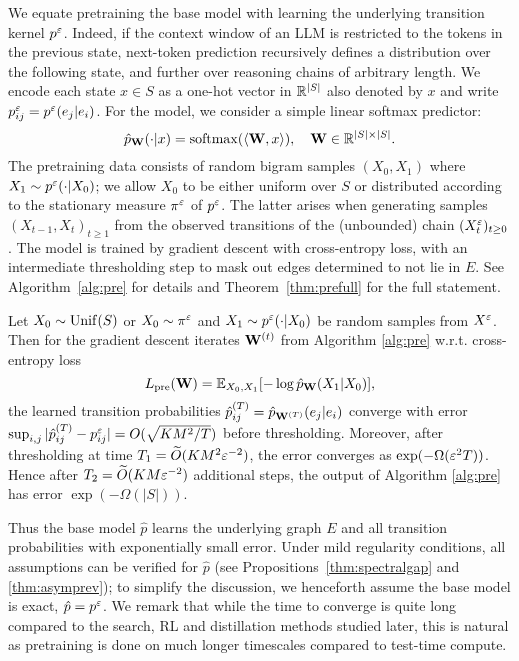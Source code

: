 We equate pretraining the base model with learning the underlying transition kernel $p^\varepsilon$. Indeed, if the context window of an LLM is restricted to the tokens in the previous state, next-token prediction recursively defines a distribution over the following state, and further over reasoning chains of arbitrary length. We encode each state $x\in S$ as a one-hot vector in $\mathbb{R}^{|S|}$ also denoted by $x$ and write $p_{ij}^\varepsilon = p^\varepsilon(e_j|e_i)$. For the model, we consider a simple linear softmax predictor:
\begin{equation*}
\hat{p}_{\mathbf{W}}(\cdot|x) = \operatorname{softmax}(\langle\mathbf{W},x\rangle), \quad \mathbf{W}\in\mathbb{R}^{|S|\times|S|}.
\end{equation*}
The pretraining data consists of random bigram samples $(X_0,X_1)$ where $X_1\sim p^\varepsilon(\cdot|X_0)$; we allow $X_0$ to be either uniform over $S$ or distributed according to the stationary measure $\pi^\varepsilon$ of $p^\varepsilon$. The latter arises when generating samples $(X_{t-1},X_t)_{t\ge 1}$ from the observed transitions of the (unbounded) chain $(X_t^\varepsilon)_{t\ge 0}$. The model is trained by gradient descent with cross-entropy loss, with an intermediate thresholding step to mask out edges determined to not lie in $E$. See Algorithm~\ref{alg:pre} for details and Theorem~\ref{thm:prefull} for the full statement.

\begin{thm}\label{thm:pre}
Let $X_0\sim\operatorname{Unif}(S)$ or $X_0\sim\pi^\varepsilon$ and $X_1\sim p^\varepsilon(\cdot|X_0)$ be random samples from $X^\varepsilon$. Then for the gradient descent iterates $\mathbf{W}^{(t)}$ from Algorithm \ref{alg:pre} w.r.t. cross-entropy loss
\begin{equation*}
L_{\operatorname{pre}}(\mathbf{W}) = \mathbb{E}_{X_0,X_1}[-\log\hat{p}_{\mathbf{W}}(X_1|X_0)],
\end{equation*}
the learned transition probabilities $\hat{p}_{ij}^{(T)} = \hat{p}_{\mathbf{W}^{(T)}}(e_j|e_i)$ converge with error $\sup_{i,j}|\hat{p}_{ij}^{(T)} - p_{ij}^\varepsilon|=O(\sqrt{KM^2/T})$ before thresholding. Moreover, after thresholding at time $T_1=\widetilde{O}(KM^2\varepsilon^{-2})$, the error converges as $\exp(-\Omega(\varepsilon^2T))$. Hence after $T_2=\widetilde{O}(KM\varepsilon^{-2})$ additional steps, the output of Algorithm \ref{alg:pre} has error $\exp(-\Omega(|S|))$.
\end{thm}

Thus the base model $\hat{p}$ learns the underlying graph $E$ and all transition probabilities with exponentially small error. Under mild regularity conditions, all assumptions can be verified for $\hat{p}$ (see Propositions~\ref{thm:spectralgap} and \ref{thm:asymprev}); to simplify the discussion, we henceforth assume the base model is exact, $\hat{p}=p^\varepsilon$. We remark that while the time to converge is quite long compared to the search, RL and distillation methods studied later, this is natural as pretraining is done on much longer timescales compared to test-time compute.


